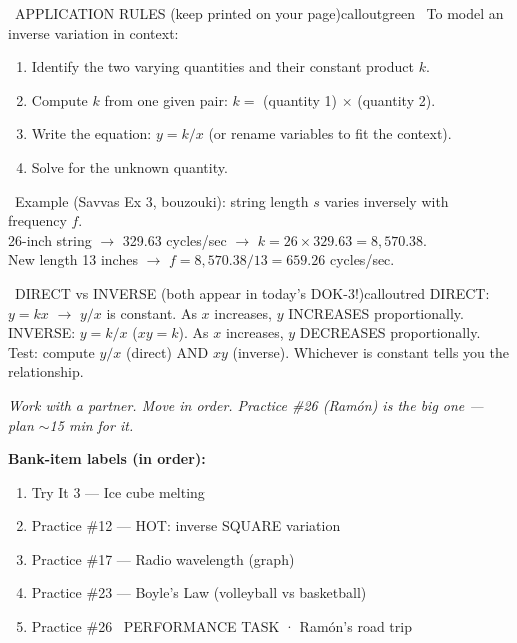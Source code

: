 \documentclass[11pt]{article}
\begin{document}
\begin{callout}{\IconBook\ APPLICATION RULES (keep printed on your page)}{calloutgreen}
\textbullet\ To model an inverse variation in context:
\begin{enumerate}[leftmargin=2.1em,itemsep=1pt,topsep=3pt]
  \item Identify the two varying quantities and their constant product \(k\).
  \item Compute \(k\) from one given pair: \(k =\) (quantity 1) \(\times\) (quantity 2).
  \item Write the equation: \(y = k/x\) (or rename variables to fit the context).
  \item Solve for the unknown quantity.
\end{enumerate}
\textbullet\ Example (Savvas Ex 3, bouzouki): string length \(s\) varies inversely with frequency \(f\).\\
\hspace*{1.6em}26-inch string \(\rightarrow\) 329.63 cycles/sec \(\rightarrow\) \(k = 26 \times 329.63 = 8{,}570.38\).\\
\hspace*{1.6em}New length 13 inches \(\rightarrow\) \(f = 8{,}570.38 / 13 = 659.26\) cycles/sec.
\end{callout}

\begin{callout}{\IconWarn\ DIRECT vs INVERSE (both appear in today's DOK-3!)}{calloutred}
DIRECT: \(y = kx\) \(\rightarrow\) \(y/x\) is constant. As \(x\) increases, \(y\) INCREASES proportionally.\\
INVERSE: \(y = k/x\) (\(xy = k\)). As \(x\) increases, \(y\) DECREASES proportionally.\\
Test: compute \(y/x\) (direct) AND \(xy\) (inverse). Whichever is constant tells you the relationship.
\end{callout}

\textit{Work with a partner. Move in order. Practice \#26 (Ramón) is the big one — plan \(\sim\)15 min for it.}

\textbf{Bank-item labels (in order):}
\begin{enumerate}[leftmargin=1.6em,itemsep=2pt,topsep=2pt]
  \item Try It 3 — Ice cube melting
  \item Practice \#12 — HOT: inverse SQUARE variation
  \item Practice \#17 — Radio wavelength (graph)
  \item Practice \#23 — Boyle's Law (volleyball vs basketball)
  \item Practice \#26  \IconStar\ PERFORMANCE TASK · Ramón's road trip
\end{enumerate}
\end{document}
